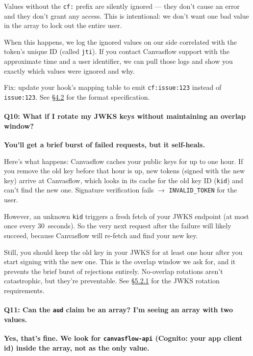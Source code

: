Values without the \texttt{cf:} prefix are silently ignored --- they don't cause an error
and they don't grant any access. This is intentional: we don't want one bad value in the
array to lock out the entire user.

When this happens, we log the ignored values on our side correlated with the token's
unique ID (called \texttt{jti}). If you contact Canvasflow support with the approximate
time and a user identifier, we can pull those logs and show you exactly which values were
ignored and why.

Fix: update your hook's mapping table to emit \texttt{cf:issue:123} instead of
\texttt{issue:123}. See \hyperref[sec:mandatory-value-format]{\S4.2} for the format specification.

\paragraph{Q10: What if I rotate my JWKS keys without maintaining an overlap window?}

\textbf{You'll get a brief burst of failed requests, but it self-heals.}

Here's what happens: Canvasflow caches your public keys for up to one hour. If you
remove the old key before that hour is up, new tokens (signed with the new key) arrive
at Canvasflow, which looks in its cache for the old key ID (\texttt{kid}) and can't find
the new one. Signature verification fails $\to$ \texttt{INVALID\_TOKEN} for the user.

However, an unknown \texttt{kid} triggers a fresh fetch of your JWKS endpoint (at most
once every 30~seconds). So the very next request after the failure will likely succeed, because
Canvasflow will re-fetch and find your new key.

Still, you should keep the old key in your JWKS for at least one hour after you start
signing with the new one. This is the overlap window we ask for, and it prevents the
brief burst of rejections entirely. No-overlap rotations aren't catastrophic, but they're
preventable. See \hyperref[sec:jwks-endpoint]{\S5.2.1} for the JWKS rotation requirements.

\pagebreak

\paragraph{Q11: Can the \texttt{aud} claim be an array? I'm seeing an array with two
values.}

\textbf{Yes, that's fine. We look for \texttt{canvasflow-api} (Cognito: your app client
id) inside the array, not as the only value.}

